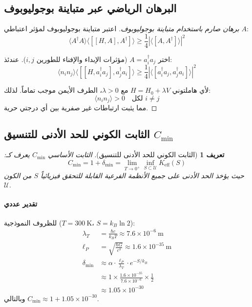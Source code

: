 \documentclass[11pt,a4paper]{article}
\newtheorem{definition}{تعريف}
\begin{document}
	\subsection{البرهان الرياضي عبر متباينة بوجوليوبوف}
	
	\begin{proof}[برهان صارم باستخدام متباينة بوجوليوبوف]
		اعتبر متباينة بوجوليوبوف لمؤثر اعتباطي $A$:
		\begin{equation}
			\langle A^\dagger A \rangle \langle [[H, A], A^\dagger] \rangle \geq \frac{1}{4} |\langle [A, A^\dagger] \rangle|^2
		\end{equation}
		
		اختر $A = a_i^\dagger a_j$ (مؤثرات الإبداء والإفناء للطورين $i,j$). عندئذ:
		\begin{equation}
			\langle n_i n_j \rangle \langle [[H, a_i^\dagger a_j], a_j^\dagger a_i] \rangle \geq \frac{1}{4} |\langle [a_i^\dagger a_j, a_j^\dagger a_i] \rangle|^2
		\end{equation}
		
		لأي هاملتوني $H = H_0 + \lambda V$ مع $\lambda > 0$، الطرف الأيمن موجب تماماً. لذلك:
		\begin{equation}
			\langle n_i n_j \rangle > 0 \quad \text{لكل } i \neq j
		\end{equation}
		مما يثبت ارتباطات غير صفرية بين أي درجتي حرية.
	\end{proof}
	
	\subsection{الثابت الكوني للحد الأدنى للتنسيق $C_{\min}$}
	
	\begin{definition}[الثابت الكوني للحد الأدنى للتنسيق]
		الثابت الأساسي $C_{\min}$ يعرف كـ:
		\begin{equation}
			C_{\min} = 1 + \delta_{\min} = \lim_{T \to 0^+} \inf_{S \subset \mathcal{U}} K_{\mathrm{eff}}(S)
		\end{equation}
		حيث يؤخذ الحد الأدنى على جميع الأنظمة الفرعية القابلة للتحقق فيزيائياً $S$ من الكون $\mathcal{U}$.
	\end{definition}
	
	\paragraph{تقدير عددي}
	للظروف النموذجية ($T = 300\ \mathrm{K}$، $S = k_B \ln 2$):
	\begin{align}
		\lambda_T &= \frac{\hbar c}{k_B T} \approx 7.6 \times 10^{-6}\ \mathrm{m} \\
		\ell_P &= \sqrt{\frac{\hbar G}{c^3}} \approx 1.6 \times 10^{-35}\ \mathrm{m} \\
		\delta_{\min} &\approx \alpha \cdot \frac{\ell_P}{\lambda_T} \cdot e^{-S/k_B} \\
		&\approx 1 \times \frac{1.6 \times 10^{-35}}{7.6 \times 10^{-6}} \times \frac{1}{2} \\
		&\approx 1.05 \times 10^{-30}
	\end{align}
	وبالتالي $C_{\min} \approx 1 + 1.05 \times 10^{-30}$.
	
\end{document}
